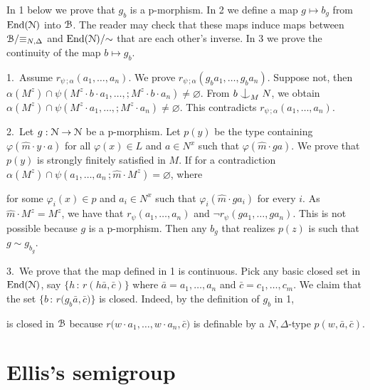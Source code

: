 \documentclass{amsproc}
\makeatletter
\def\nonfork{\mathrel{\raise0.2ex\hbox{\ooalign{\hidewidth$\vert$\hidewidth\cr\raise-0.8ex\hbox{$\smile$}}}}}
\def\B{\EuScript B}
\def\N{\EuScript N}
\def\phi{\varphi}
\theoremstyle{mio}
\providecommand{\proofNameStyle}{\bfseries}
\renewenvironment{proof}[1][\proofname]{\par
  \pushQED{\qed}%
  \normalfont%
  \trivlist
  \item[\hskip\labelsep
        \proofNameStyle
    #1\@addpunct{.}]\ignorespaces
}{%
  \popQED\endtrivlist\@endpefalse
}
\makeatother
\begin{document}
\begin{proof}
  In 1 below we prove that $g_b$ is a p-morphism.
  In 2 we define a map $g\mapsto b_g$ from ${\rm End}(\N)$ into $\B$.
  The reader may check that these maps induce maps between $\B/{\equiv_{N,\Delta}}$ and ${\rm End}(\N)/{\sim}$ that are each other's inverse.
  In 3 we prove the continuity of the map $b\mapsto g_b$.

  1.\ 
  Assume $r_{\psi\,;\alpha}(a_1,\dots,a_n)$.
  We prove $r_{\psi\,;\alpha}(g_ba_1,\dots,g_ba_n)$.
  Suppose not, then $\alpha(M^z)\cap\psi(M^z\cdot b\cdot a_1,\dots,;M^z\cdot b\cdot a_n)\neq\varnothing$.
  From  $b\nonfork_MN$, we obtain $\alpha(M^z)\cap\psi(M^z\cdot a_1,\dots,;M^z\cdot a_n)\neq\varnothing$.
  This contradicts $r_{\psi\,;\alpha}(a_1,\dots,a_n)$.
  
  2.\ 
  Let $g:\N\to\N$ be a p-morphism.
  Let $p(y)$ be the type containing $\phi(\hat m\cdot y\cdot a)$ for all $\phi(x)\in L$ and $a\in N^x$ such that $\phi(\hat m\cdot ga)$.
  We prove that $p(y)$ is strongly finitely satisfied in $M$.
  If for a contradiction $\alpha(M^z)\cap\psi(a_1,\dots,a_n\,;\hat m\cdot M^z)=\varnothing$, where 

  \ceq{\hfill\psi(x_1,\dots,x_n\,;z)}{=}{\bigwedge_{i=1}^n\phi_i(z\cdot x_i)}

  for some $\phi_i(x)\in p$ and $a_i\in N^x$ such that $\phi_i(\hat m\cdot g\!a_i)$ for every $i$.
  As $\hat m\cdot M^z=M^z$, we have that $r_\psi(a_1,\dots,a_n)$ and $\neg r_\psi(g\!a_1,\dots,g\!a_n)$.
  This is not possible because $g$ is a p-morphism.
  Then any $b_g$ that realizes $p(z)$ is such that $g\sim g_{b_g}$.
 
  3.\ 
  We prove that the map defined in 1 is continuous.
  Pick any basic closed set in ${\rm End}(\N)$, say $\big\{ h\, :\, r(h\bar a,\bar c)\big\}$ where $\bar a=a_1,\dots,a_n$ and $\bar c=c_1,\dots,c_m$.
  We claim that the set $\big\{b\, :\, r(g_b\bar a,\bar c\big)\}$ is closed.
  Indeed, by the definition of $g_b$ in 1,

  
  is closed in $\B$ because $r\big(w\cdot a_1,\dots,w\cdot a_n,\bar c\big)$ is definable by a $N,\Delta$-type $p(w,\bar a,\bar c)$.
\end{proof}

\section{Ellis's semigroup}\label{Ellis}
\end{document}
